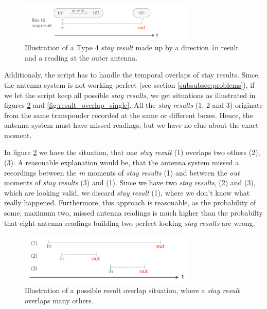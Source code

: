 \begin{figure}[htpb]
\begin{center}
  \includegraphics[width=0.75\textwidth]{assets/pdf/stay_result_type_4_schema.pdf}
  \caption{Illustration of a Type 4 \textit{stay result} made up by a direction \lstinline|in| result and a reading at the outer antenna.}
  \label{fig:type_4_stay_result}
\end{center}
\end{figure}

Additionaly, the script has to handle the temporal overlaps of stay results. Since, the antenna system is not working perfect (see section \ref{subsubsec:problems}), if we let the script keep all possible \textit{stay results}, we get situations as illustrated in figures \ref{fig:result_overlap} and \ref{fig:result_overlap_single}. All the \textit{stay results} (1, 2 and 3) originate from the same transponder recorded at the same or different boxes. Hence, the antenna system must have missed readings, but we have no clue about the exact moment.  

In figure \ref{fig:result_overlap} we have the situation, that one \textit{stay result} (1) overlaps two others (2),(3). A reasonable explanation would be, that the antenna system missed a recordings between the \textit{in} moments of \textit{stay results} (1) and between the \textit{out} moments of \textit{stay results} (3) and (1). Since we have two \textit{stay results}, (2) and (3), which are looking valid, we discard \textit{stay result} (1), where we don't know what really happened. Furthermore, this approach is reasonable, as the probability of some, maximum two, missed antenna readings is much higher than the probabilty that eight antenna readings building two perfect looking \textit{stay results} are wrong.
 
\begin{figure}[htpb]
\begin{center}
  \includegraphics[width=0.75\textwidth]{assets/pdf/result_overlaps_schema.pdf}
  \caption[Multiple result overlap illustration]{Illustration of a possible result overlap situation, where a \textit{stay result} overlaps many others.}
  \label{fig:result_overlap}
\end{center}
\end{figure}


